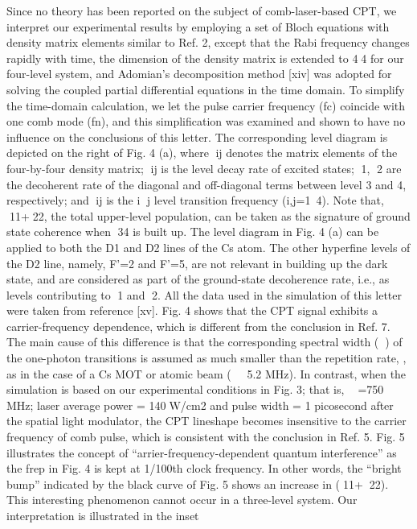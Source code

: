 \documentclass[%
reprint,  
aps,
prl,
showpacs,
preprint,
]{revtex4}
\begin{document}
Since no theory has been reported on the subject of comb-laser-based CPT, we 
interpret our experimental results by employing a set of Bloch equations with 
density matrix elements similar to Ref. 2, except that the Rabi frequency changes 
rapidly with time, the dimension of the density matrix is extended to 44 for our 
four-level system, and Adomian’s decomposition method [xiv] was adopted for solving 
the coupled partial differential equations in the time domain. To simplify the 
time-domain calculation, we let the pulse carrier frequency (fc) coincide with 
one comb mode (fn), and this simplification was examined and shown to have no 
influence on the conclusions of this letter. The corresponding level diagram is 
depicted on the right of Fig. 4 (a), where ij denotes the matrix elements of the 
four-by-four density matrix; ij is the level decay rate of excited states; 1, 2 
are the decoherent rate of the diagonal and off-diagonal terms between level 3 and 4, 
respectively; and ij is the i j level transition frequency (i,j=1~4). Note that,
11+22, the total upper-level population, can be taken as the signature of ground 
state coherence when 34 is built up. The level diagram in Fig. 4 (a) can be applied 
to both the D1 and D2 lines of the Cs atom. The other hyperfine levels of the D2 line,
namely, F’=2 and F’=5, are not relevant in building up the dark state, and are 
considered as part of the ground-state decoherence rate, i.e., as levels contributing 
to 1 and 2. All the data used in the simulation of this letter were taken from 
reference [xv]. Fig. 4 shows that the CPT signal exhibits a carrier-frequency dependence, 
which is different from the conclusion in Ref. 7. The main cause of this difference 
is that the corresponding spectral width () of the one-photon transitions is 
assumed as much smaller than the repetition rate, , as in the case of a Cs MOT 
or atomic beam (5.2 MHz). In contrast, when the simulation is based on our 
experimental conditions in Fig. 3; that is,  =750 MHz; laser average power = 
140W/cm2 and pulse width = 1 picosecond after the spatial light modulator, the 
CPT lineshape becomes insensitive to the carrier frequency of comb pulse, which 
is consistent with the conclusion in Ref. 5. Fig. 5 illustrates the concept of 
``arrier-frequency-dependent quantum interference'' as the frep in Fig. 4 is kept 
at 1/100th clock frequency. In other words, the ``bright bump'' indicated by the 
black curve of Fig. 5 shows an increase in (11+22). This interesting phenomenon 
cannot occur in a three-level system. Our interpretation is illustrated in the inset 
\end{document}
